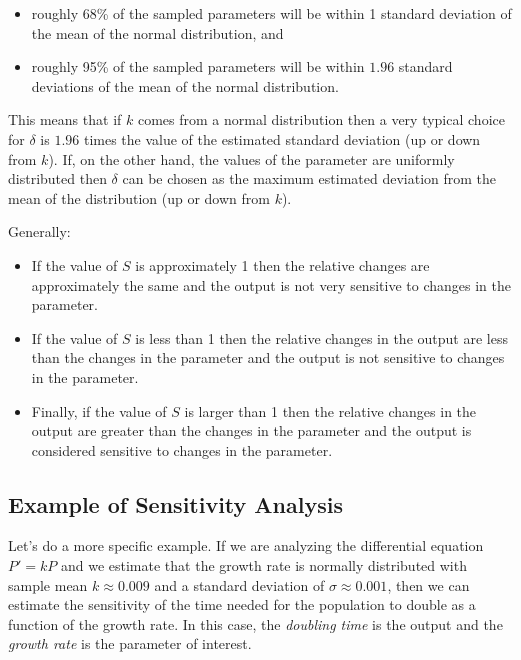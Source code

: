 \documentclass[
]{book}
\theoremstyle{definition}
\theoremstyle{definition}
\theoremstyle{definition}
\theoremstyle{remark}
\begin{document}
\begin{itemize}
\item
  roughly 68\% of the sampled parameters will be within 1 standard
  deviation of the mean of the normal distribution, and
\item
  roughly 95\% of the sampled parameters will be within \(1.96\) standard
  deviations of the mean of the normal distribution.
\end{itemize}

This means that if \(k\) comes from a normal distribution then a very
typical choice for \(\delta\) is \(1.96\) times the value of the estimated
standard deviation (up or down from \(k\)). If, on the other hand, the
values of the parameter are uniformly distributed then \(\delta\) can be
chosen as the maximum estimated deviation from the mean of the
distribution (up or down from \(k\)).

Generally:

\begin{itemize}
\item
  If the value of \(S\) is approximately 1 then the relative changes are
  approximately the same and the output is not very sensitive to
  changes in the parameter.
\item
  If the value of \(S\) is less than 1 then the relative changes in the
  output are less than the changes in the parameter and the output is
  not sensitive to changes in the parameter.
\item
  Finally, if the value of \(S\) is larger than 1 then the relative
  changes in the output are greater than the changes in the parameter
  and the output is considered sensitive to changes in the parameter.
\end{itemize}

\hypertarget{example-of-sensitivity-analysis}{%
\subsection{Example of Sensitivity Analysis}\label{example-of-sensitivity-analysis}}

Let's do a more specific example. If we are analyzing the differential
equation \(P' = kP\) and we estimate that the growth rate is normally
distributed with sample mean \(k \approx 0.009\) and a standard deviation of \(\sigma \approx 0.001\), then we can
estimate the sensitivity of the time needed for the population to double
as a function of the growth rate. In this case, the \emph{doubling time} is
the output and the \emph{growth rate} is the parameter of interest.
\end{document}
